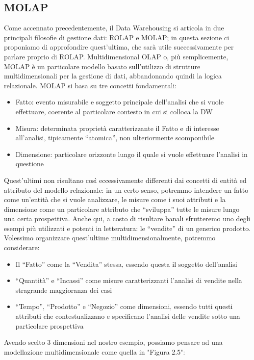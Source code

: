 \documentclass[a4paper,12pt]{report}
\begin{document}
\subsection{MOLAP}
Come accennato precedentemente, il Data Warehousing si articola in due principali filosofie di gestione dati: ROLAP e MOLAP; in questa sezione ci proponiamo di approfondire quest’ultima, che sarà utile successivamente per parlare proprio di ROLAP. Multidimensional OLAP o, più semplicemente, MOLAP è un particolare modello basato sull’utilizzo di strutture multidimensionali per la gestione di dati, abbandonando quindi la logica relazionale. MOLAP si basa su tre concetti fondamentali:
\begin{itemize}
    \item Fatto: evento misurabile e soggetto principale dell’analisi che si vuole effettuare, coerente al particolare contesto in cui si colloca la DW
    \item Misura: determinata proprietà caratterizzante il Fatto e di interesse all’analisi, tipicamente “atomica”, non ulteriormente scomponibile
    \item Dimensione: particolare orizzonte lungo il quale si vuole effettuare l’analisi in questione
\end{itemize}
Quest’ultimi non risultano così eccessivamente differenti dai concetti di entità ed attributo del modello relazionale: in un certo senso, potremmo intendere un fatto come un’entità che si vuole analizzare, le misure come i suoi attributi e la dimensione come un particolare attributo che “sviluppa” tutte le misure lungo una certa prospettiva. Anche qui, a costo di risultare banali sfrutteremo uno degli esempi più utilizzati e potenti in letteratura: le “vendite” di un generico prodotto. Volessimo organizzare quest’ultime multidimensionalmente, potremmo considerare:
\begin{itemize}
    \item Il “Fatto” come la “Vendita” stessa, essendo questa il soggetto dell’analisi
    \item “Quantità” e “Incassi” come misure caratterizzanti l’analisi di vendite nella stragrande maggioranza dei casi
    \item “Tempo”, “Prodotto” e “Negozio” come dimensioni, essendo tutti questi attributi che contestualizzano e specificano l’analisi delle vendite sotto una particolare prospettiva
\end{itemize}
Avendo scelto $3$ dimensioni nel nostro esempio, possiamo pensare ad una modellazione multidimensionale come quella in "Figura 2.5":
\end{document}
